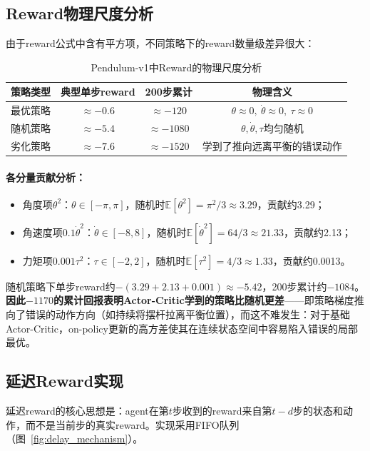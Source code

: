 \documentclass[UTF8,a4paper,12pt]{ctexart}
\begin{document}
\subsection{Reward物理尺度分析}

由于reward公式中含有平方项，不同策略下的reward数量级差异很大：

\begin{table}[H]
\centering
\caption{Pendulum-v1中Reward的物理尺度分析}
\label{tab:reward_scale}
\begin{tabular}{lccc}
\toprule
\textbf{策略类型} & \textbf{典型单步reward} & \textbf{200步累计} & \textbf{物理含义} \\
\midrule
最优策略 & $\approx -0.6$ & $\approx -120$ & $\theta\approx0,\ \dot\theta\approx0,\ \tau\approx0$ \\
随机策略 & $\approx -5.4$ & $\approx -1080$ & $\theta,\dot\theta,\tau$均匀随机 \\
劣化策略 & $\approx -7.6$ & $\approx -1520$ & 学到了推向远离平衡的错误动作 \\
\bottomrule
\end{tabular}
\end{table}

\paragraph{各分量贡献分析：}
\begin{itemize}[leftmargin=2em]
  \item 角度项$\theta^2$：$\theta\in[-\pi,\pi]$，随机时$\mathbb{E}[\theta^2] = \pi^2/3 \approx 3.29$，贡献约3.29；
  \item 角速度项$0.1\dot\theta^2$：$\dot\theta\in[-8,8]$，随机时$\mathbb{E}[\dot\theta^2] = 64/3 \approx 21.33$，贡献约2.13；
  \item 力矩项$0.001\tau^2$：$\tau\in[-2,2]$，随机时$\mathbb{E}[\tau^2] = 4/3 \approx 1.33$，贡献约0.0013。
\end{itemize}
随机策略下单步reward约$-(3.29+2.13+0.001) \approx -5.42$，200步累计约$-1084$。\textbf{因此$-1170$的累计回报表明Actor-Critic学到的策略比随机更差}——即策略梯度推向了错误的动作方向（如持续将摆杆拉离平衡位置），而这不难发生：对于基础Actor-Critic，on-policy更新的高方差使其在连续状态空间中容易陷入错误的局部最优。

\subsection{延迟Reward实现}

延迟reward的核心思想是：agent在第$t$步收到的reward来自第$t-d$步的状态和动作，而不是当前步的真实reward。实现采用FIFO队列（图~\ref{fig:delay_mechanism}）。
\end{document}
